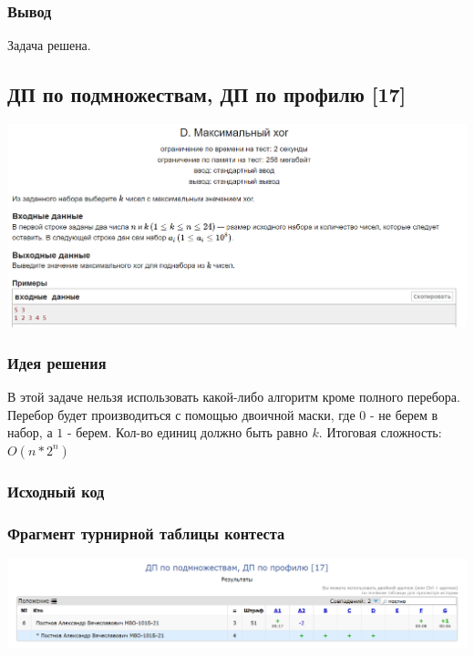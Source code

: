 \subsubsection*{Вывод}
Задача решена.

\vspace{20pt}

\pagebreak

\subsection*{ДП по подмножествам, ДП по профилю [17]}
\begin{center}
\includegraphics[width=\textwidth]{statements/19.png}
\end{center}
\subsubsection*{Идея решения}
В этой задаче нельзя использовать какой-либо алгоритм кроме полного перебора. Перебор будет производиться с помощью двоичной маски, где $0$ - не берем в набор, а $1$ - берем. Кол-во единиц должно быть равно $k$. 
Итоговая сложность: $O(n*2^n)$
\subsubsection*{Исходный код}


\subsubsection*{Фрагмент турнирной таблицы контеста}
\begin{center}
\includegraphics[width=\textwidth]{standings/19.png}\newline\noindent
\end{center}

